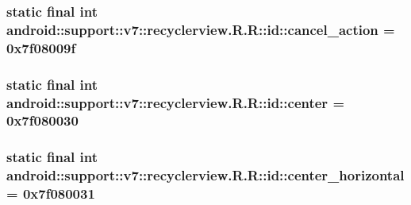 \hypertarget{classandroid_1_1support_1_1v7_1_1recyclerview_1_1_r_1_1id_1b6fb6626e982dd4b82f3dc455047fb7}{
\subsubsection[{cancel\_\-action}]{\setlength{\rightskip}{0pt plus 5cm}static final int android::support::v7::recyclerview.R.R::id::cancel\_\-action = 0x7f08009f}}
\label{classandroid_1_1support_1_1v7_1_1recyclerview_1_1_r_1_1id_1b6fb6626e982dd4b82f3dc455047fb7}


\hypertarget{classandroid_1_1support_1_1v7_1_1recyclerview_1_1_r_1_1id_a7c98937452978918dbfc31ad4bd3a91}{
\subsubsection[{center}]{\setlength{\rightskip}{0pt plus 5cm}static final int android::support::v7::recyclerview.R.R::id::center = 0x7f080030}}
\label{classandroid_1_1support_1_1v7_1_1recyclerview_1_1_r_1_1id_a7c98937452978918dbfc31ad4bd3a91}


\hypertarget{classandroid_1_1support_1_1v7_1_1recyclerview_1_1_r_1_1id_797e8ab0e5378302d97715a4388db5da}{
\subsubsection[{center\_\-horizontal}]{\setlength{\rightskip}{0pt plus 5cm}static final int android::support::v7::recyclerview.R.R::id::center\_\-horizontal = 0x7f080031}}
\label{classandroid_1_1support_1_1v7_1_1recyclerview_1_1_r_1_1id_797e8ab0e5378302d97715a4388db5da}


